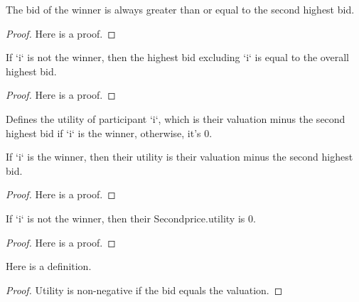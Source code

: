\begin{lemma}\label{maxBidExcluding_le_maxBid}
    \leanok
    The bid of the winner is always greater than or equal to the second highest bid.
\end{lemma}
\begin{proof}
    Here is a proof.
\end{proof}

\begin{lemma}\label{maxBidExcluding_eq_maxBid_if_loser}
    \leanok
    If `i` is not the winner, then the highest bid excluding `i` is equal to the overall highest bid.
\end{lemma}
\begin{proof}
    Here is a proof.
\end{proof}

\begin{definition}\label{Secondprice.utility}
    \leanok
    Defines the utility of participant `i`, which is their valuation minus the second highest bid if `i` is the winner, otherwise, it's 0.
\end{definition}

\begin{lemma}\label{Secondprice.utility_winner}
    \leanok
    If `i` is the winner, then their utility is their valuation minus the second highest bid.
\end{lemma}
\begin{proof}
    Here is a proof.
\end{proof}

\begin{lemma}\label{Secondprice.utility_loser}
    \leanok
    If `i` is not the winner, then their Secondprice.utility is 0.
\end{lemma}
\begin{proof}
    Here is a proof.
\end{proof}


\begin{lemma}\label{Secondprice.utility_nneg}
    \leanok
    Here is a definition.
\end{lemma}
\begin{proof}
    Utility is non-negative if the bid equals the valuation.
\end{proof}

